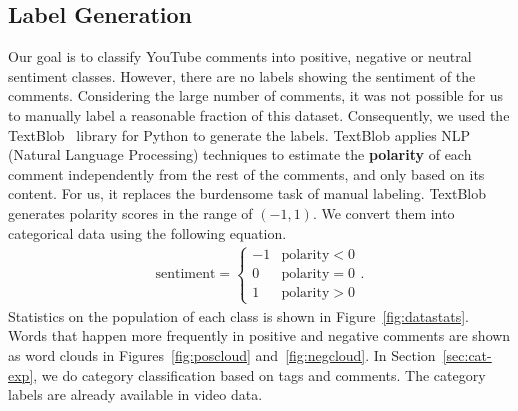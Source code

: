 \subsection{Label Generation}
\label{sec:label}
Our goal is to classify YouTube comments into positive, negative or neutral sentiment classes. However, there are no labels showing the sentiment of the comments. Considering the large number of comments, it was not possible for us to manually label a reasonable fraction of this dataset. Consequently, we used the TextBlob~\cite{textblob} library for Python to generate the labels. TextBlob applies NLP (Natural Language Processing) techniques to estimate the \textbf{polarity} of each comment independently from the rest of the comments, and only based on its content. For us, it replaces the burdensome task of manual labeling. TextBlob generates polarity scores in the range of $(-1,1)$. We convert them into categorical data using the following equation.
\begin{eqnarray*}
\textrm{sentiment}=
\begin{cases}
-1 & \textrm{polarity} < 0\\
0 & \textrm{polarity} = 0\\
1 & \textrm{polarity} > 0
\end{cases}.
\label{eq:sentiment}
\end{eqnarray*}
Statistics on the population of each class is shown in Figure~\ref{fig:datastats}.
Words that happen more frequently in positive and negative comments are shown as word clouds in Figures~\ref{fig:poscloud} and~\ref{fig:negcloud}.
In Section~\ref{sec:cat-exp}, we do category classification based on tags and comments. The category labels are already available in video data.

